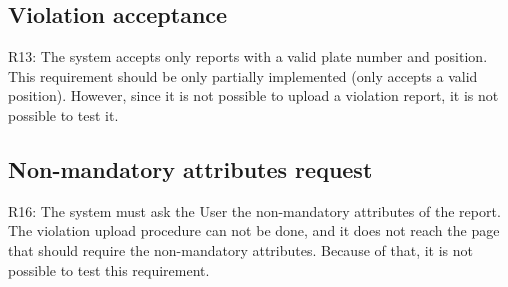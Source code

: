 \documentclass[../ATD.tex]{subfiles}
\begin{document}
    \subsection{Violation acceptance}\label{subsec:violation-acceptance}
    R13: The system accepts only reports with a valid plate number and position.
    \newline
    This requirement should be only partially implemented (only accepts a valid position).
    However, since it is not possible to upload a violation report, it is not possible to test it.

    \subsection{Non-mandatory attributes request}\label{subsec:non-mandatory-attribure-request}
    R16: The system must ask the User the non-mandatory attributes of the report.
    \newline
    The violation upload procedure can not be done, and it does not reach the page that should require the non-mandatory attributes.
    Because of that, it is not possible to test this requirement.
\end{document}
